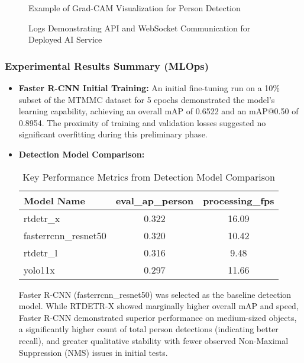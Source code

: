 \begin{figure}[!htb]
    \centering
    \caption{Example of Grad-CAM Visualization for Person Detection}
    \label{fig:progress_gradcam_example}
\end{figure}

\begin{figure}[!htb]
    \centering
    \caption{Logs Demonstrating API and WebSocket Communication for Deployed AI Service}
    \label{fig:progress_api_logs}
\end{figure}
\clearpage

\subsubsection*{Experimental Results Summary (MLOps)}
\begin{itemize}
    \item \textbf{Faster R-CNN Initial Training:} An initial fine-tuning run on a 10\% subset of the MTMMC dataset for 5 epochs demonstrated the model's learning capability, achieving an overall mAP of 0.6522 and an mAP@0.50 of 0.8954. The proximity of training and validation losses suggested no significant overfitting during this preliminary phase.
    \item \textbf{Detection Model Comparison:}
        \begin{table}[!htb]
          \centering
          \caption{Key Performance Metrics from Detection Model Comparison}
          \label{tab:progress_model_comparison_summary}
          \begin{tabular}{@{}lcc@{}}
            \toprule
            Model Name & eval\_ap\_person & processing\_fps \\ \midrule
            {rtdetr\_x} & 0.322 & 16.09 \\
            {fasterrcnn\_resnet50} & 0.320 & 10.42 \\
            {rtdetr\_l} & 0.316 & 9.48 \\
            {yolo11x} & 0.297 & 11.66 \\ \bottomrule
          \end{tabular}%
        \end{table}
    
        Faster R-CNN (fasterrcnn\_resnet50) was selected as the baseline detection model. While RTDETR-X showed marginally higher overall mAP and speed, Faster R-CNN demonstrated superior performance on medium-sized objects, a significantly higher count of total person detections (indicating better recall), and greater qualitative stability with fewer observed Non-Maximal Suppression (NMS) issues in initial tests.
\end{itemize}


